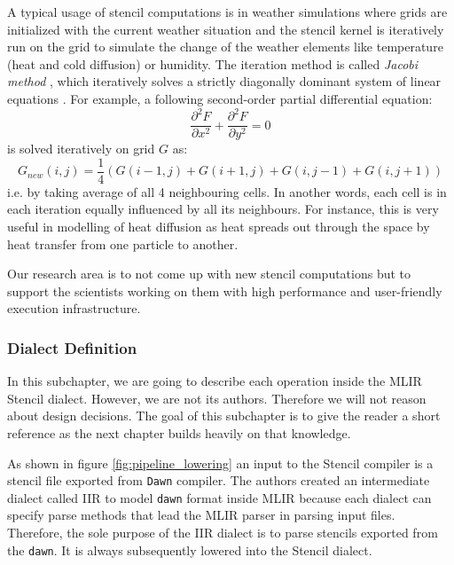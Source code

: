 \documentclass[sigplan,\review anonymous]{acmart}
\begin{document}
A typical usage of stencil computations is in weather simulations where
grids are initialized with the current weather situation and the stencil kernel
is iteratively run on the grid to simulate the change of the weather elements
like temperature (heat and cold diffusion) or humidity. The iteration method
is called \textit{Jacobi method} \cite{jacobi}, which iteratively solves a
strictly diagonally dominant system \cite{diagonal_matrix} of linear equations
\cite{linear_eq}. For example, a following second-order partial differential
equation:
\begin{equation}
\frac{\partial^2 F}{\partial x^2} + \frac{\partial^2 F}{\partial y^2} = 0
\end{equation}
\noindent is solved iteratively on grid $G$ as:
\begin{equation}
  G_{new}(i,j) = \frac{1}{4}(G(i-1,j) + G(i+1,j) + G(i,j-1) + G(i,j+1))
\end{equation}
\noindent i.e. by taking average of all 4 neighbouring cells. In another
words, each cell is in each iteration equally influenced by all its neighbours.
For instance, this is very useful in modelling of heat diffusion as heat
spreads out through the space by heat transfer from one particle to another.

Our research area is to not come up with new stencil computations but to
support the scientists working on them with high performance and user-friendly
execution infrastructure.

\subsubsection{Dialect Definition}

In this subchapter, we are going to describe each operation inside the MLIR
Stencil dialect. However, we are not its authors. Therefore we will not reason
about design decisions. The goal of this subchapter is to give the reader a
short reference as the next chapter builds heavily on that knowledge.

As shown in figure \ref{fig:pipeline_lowering} an input to the Stencil compiler
is a stencil file exported from \texttt{Dawn} \cite{dawn} compiler. The
authors created an intermediate dialect called IIR to model \texttt{dawn}
format inside MLIR because each dialect can specify parse methods that lead
the MLIR parser in parsing input files. Therefore, the sole purpose of the IIR
dialect is to parse stencils exported from the \texttt{dawn}. It is always
subsequently lowered into the Stencil dialect. 
\end{document}
